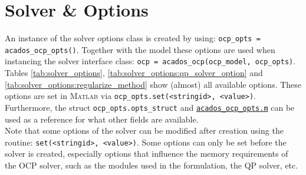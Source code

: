 \documentclass[english]{article}
\newcommand{\code}[1]{\texttt{#1}}
\newcommand{\matlab}{\textsc{Matlab}}
\begin{document}
\section{Solver \& Options}\label{sec:solver}
%
An instance of the solver options class is created by using: \code{ocp\_opts = acados\_ocp\_opts()}.
Together with the model these options are used when instancing the solver interface class: \code{ocp = acados\_ocp(ocp\_model, ocp\_opts)}.\\
Tables \ref{tab:solver_options}, \ref{tab:solver_options:qp_solver_option} and \ref{tab:solver_options:regularize_method} show (almost) all available options.
These options are set in \matlab{} via \code{ocp\_opts.set(<stringid>, <value>)}.
Furthermore, the struct \code{ocp\_opts.opts\_struct} and \href{https://github.com/acados/acados/blob/master/interfaces/acados_matlab_octave/acados_ocp_opts.m}{\code{acados\_ocp\_opts.m}} can be used as a reference for what other fields are available.
\\
Note that some options of the solver can be modified after creation using the routine: \code{set(<stringid>, <value>)}.
Some options can only be set before the solver is created, especially options that influence the memory requirements of the OCP solver, such as the modules used in the formulation, the QP solver, etc.
\end{document}
